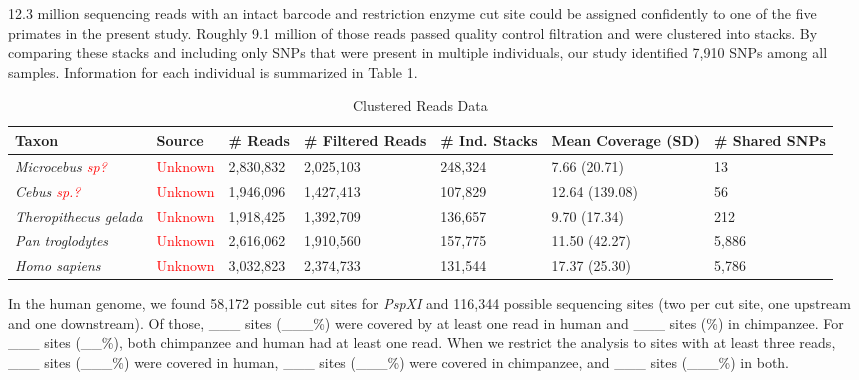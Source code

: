 \documentclass[12pt]{article}
\begin{document}
12.3 million sequencing reads with an intact barcode and restriction enzyme cut site could be assigned confidently to one of the five primates in the present study. Roughly 9.1 million of those reads passed quality control filtration and were clustered into stacks. By comparing these stacks and including only SNPs that were present in multiple individuals, our study identified 7,910 SNPs among all samples. Information for each individual is summarized in Table 1. 

\begin{table}[h]
\caption{Clustered Reads Data}
\begin{center}
	\small
	\begin{tabular}{ p{3cm} || l || p{1.75cm} | p{1.75cm} || p{1.75cm} | p{1.75cm} | l }
		\hline
		Taxon                                  & Source                   & \# Reads & \# Filtered Reads & \# Ind. Stacks & Mean Coverage (SD)  & \# Shared SNPs \\ \hline\hline
		\emph{Microcebus \textcolor{red}{sp?}} & \textcolor{red}{Unknown} &  2,830,832 & 2,025,103       & 248,324         &  7.66 (20.71)  & 13 \\ \hline
		\emph{Cebus \textcolor{red}{sp.?}}     & \textcolor{red}{Unknown} &  1,946,096 & 1,427,413       & 107,829         & 12.64 (139.08) & 56 \\ \hline
		\emph{Theropithecus gelada}            & \textcolor{red}{Unknown} &  1,918,425 & 1,392,709       & 136,657         &  9.70 (17.34)  & 212 \\ \hline
		\emph{Pan troglodytes}                 & \textcolor{red}{Unknown} &  2,616,062 & 1,910,560       & 157,775         & 11.50 (42.27)  & 5,886 \\ \hline
		\emph{Homo sapiens}                    & \textcolor{red}{Unknown} &  3,032,823 & 2,374,733       & 131,544         & 17.37 (25.30)  & 5,786 \\ \hline
	\end{tabular}
\end{center}
\end{table}

In the human genome, we found 58,172 possible cut sites for \emph{PspXI} and 116,344 possible sequencing sites (two per cut site, one upstream and one downstream). Of those, \_\_\_ sites (\_\_\_\%) were covered by at least one read in human and \_\_\_ sites (\%) in chimpanzee. For \_\_\_ sites (\_\_\%), both chimpanzee and human had at least one read. When we restrict the analysis to sites with at least three reads, \_\_\_ sites (\_\_\_\%) were covered in human, \_\_\_ sites (\_\_\_\%) were covered in chimpanzee, and \_\_\_ sites (\_\_\_\%) in both.
\end{document}
